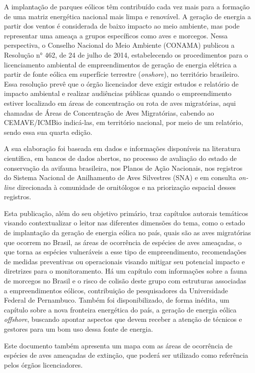 \documentclass[
  oneside]{scrbook}
\begin{document}
A implantação de parques eólicos têm contribuído cada vez mais para a formação de uma matriz energética nacional mais limpa e renovável. A geração de energia a partir dos ventos é considerada de baixo impacto ao meio ambiente, mas pode representar uma ameaça a grupos específicos como aves e morcegos. Nessa perspectiva, o Conselho Nacional do Meio Ambiente (CONAMA) publicou a Resolução n° 462, de 24 de julho de 2014, estabelecendo os procedimentos para o licenciamento ambiental de empreendimentos de geração de energia elétrica a partir de fonte eólica em superfície terrestre (\emph{onshore}), no território brasileiro. Essa resolução prevê que o órgão licenciador deve exigir estudos e relatório de impacto ambiental e realizar audiências públicas quando o empreendimento estiver localizado em áreas de concentração ou rota de aves migratórias, aqui chamadas de Áreas de Concentração de Aves Migratórias, cabendo ao CEMAVE/ICMBio indicá-las, em território nacional, por meio de um relatório, sendo essa sua quarta edição.

A sua elaboração foi baseada em dados e informações disponíveis na literatura científica, em bancos de dados abertos, no processo de avaliação do estado de conservação da avifauna brasileira, nos Planos de Ação Nacionais, nos registros do Sistema Nacional de Anilhamento de Aves Silvestres (SNA) e em consulta \emph{on-line} direcionada à comunidade de ornitólogos e na priorização espacial desses registros.

Esta publicação, além do seu objetivo primário, traz capítulos autorais temáticos visando contextualizar o leitor nas diferentes dimensões do tema, como o estado de implantação da geração de energia eólica no país, quais são as aves migratórias que ocorrem no Brasil, as áreas de ocorrência de espécies de aves ameaçadas, o que torna as espécies vulneráveis a esse tipo de empreendimento, recomendações de medidas preventivas ou operacionais visando mitigar seu potencial impacto e diretrizes para o monitoramento. Há um capítulo com informações sobre a fauna de morcegos no Brasil e o risco de colisão deste grupo com estruturas associadas a empreendimentos eólicos, contribuição de pesquisadores da Universidade Federal de Pernambuco. Também foi disponibilizado, de forma inédita, um capítulo sobre a nova fronteira energética do país, a geração de energia eólica \emph{offshore}, buscando apontar aspectos que devem receber a atenção de técnicos e gestores para um bom uso dessa fonte de energia.

Este documento também apresenta um mapa com as áreas de ocorrência de espécies de aves ameaçadas de extinção, que poderá ser utilizado como referência pelos órgãos licenciadores.
\end{document}

